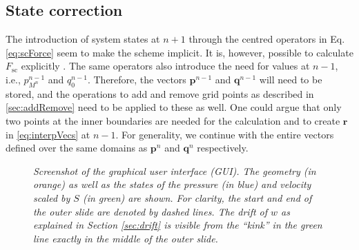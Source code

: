 \subsection{State correction}\label{sec:impStateCorr}
The introduction of system states at $n+1$ through the centred operators in Eq. \eqref{eq:scForce} seem to make the scheme implicit. It is, however, possible to calculate $F_\text{sc}$ explicitly \cite{bilbao2009, bilbao2009dafx}. The same operators also introduce the need for values at $n-1$, i.e., $p_{M^n}^{n-1}$ and $q_{0}^{n-1}$. Therefore, the vectors $\mathbf{p}^{n-1}$ and $\mathbf{q}^{n-1}$ will need to be stored, and the operations to add and remove grid points as described in \ref{sec:addRemove} need to be applied to these as well. One could argue that only two points at the inner boundaries are needed for the calculation and to create $\mathbf{r}$ in \eqref{eq:interpVecs} at $n-1$. For generality, we continue with the entire vectors defined over the same domains as $\mathbf{p}^n$ and $\mathbf{q}^n$ respectively. 
\begin{figure}[t]
    \centering
    \setlength{\fboxsep}{0pt} 
    \caption{\it Screenshot of the graphical user interface (GUI). The geometry (in orange) as well as the states of the pressure (in blue) and velocity scaled by $S$ (in green) are shown. For clarity, the start and end of the outer slide are denoted by dashed lines. The drift of $w$ as explained in Section \ref{sec:drift} is visible from the ``kink'' in the green line exactly in the middle of the outer slide.}
    \label{fig:GUI}
\end{figure}

